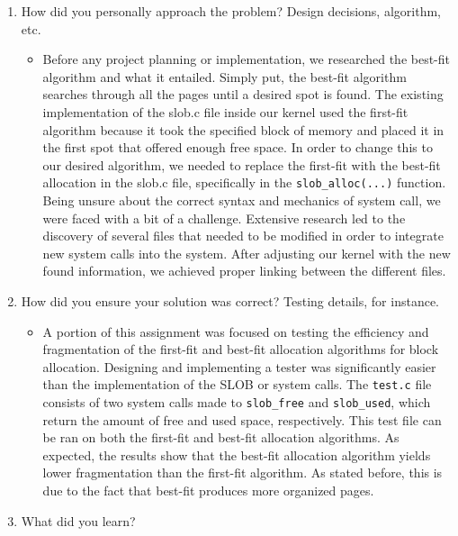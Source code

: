 \documentclass[letterpaper,10pt,onecolumn]{IEEEtran}
\newcommand\tab[1][1cm]{\hspace*{#1}}
\begin{document}
\begin{enumerate}
\begin{itemize}
        \end{itemize}
        \item How did you personally approach the problem? Design decisions, algorithm, etc.
        \begin{itemize}
            \item \tab Before any project planning or implementation, we researched the best-fit algorithm and what it entailed. Simply put, the best-fit algorithm searches through all the pages until a desired spot is found. The existing implementation of the slob.c file inside our kernel used the first-fit algorithm because it took the specified block of memory and placed it in the first spot that offered enough free space. In order to change this to our desired algorithm, we needed to replace the first-fit with the best-fit allocation in the slob.c file, specifically in the \texttt{slob\_alloc(...)} function.\\
            \tab Being unsure about the correct syntax and mechanics of system call, we were faced with a bit of a challenge. Extensive research led to the discovery of several files that needed to be modified in order to integrate new system calls into the system. After adjusting our kernel with the new found information, we achieved proper linking between the different files.
        \end{itemize}
        \item How did you ensure your solution was correct? Testing details, for instance.
        \begin{itemize}
            \item \tab A portion of this assignment was focused on testing the efficiency and fragmentation of the first-fit and best-fit allocation algorithms for block allocation. Designing and implementing a tester was significantly easier than the implementation of the SLOB or system calls. The \texttt{test.c} file consists of two system calls made to \texttt{slob\_free} and \texttt{slob\_used}, which return the amount of free and used space, respectively. This test file can be ran on both the first-fit and best-fit allocation algorithms. As expected, the results show that the best-fit allocation algorithm yields lower fragmentation than the first-fit algorithm. As stated before, this is due to the fact that best-fit produces more organized pages.
        \end{itemize}
        \item What did you learn?
        \begin{itemize}

\end{itemize}
\end{enumerate}
\end{document}
